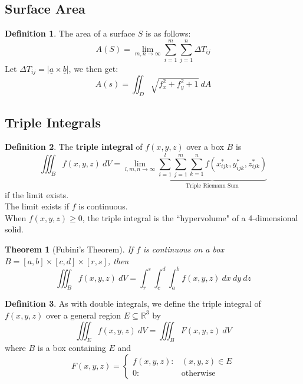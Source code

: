 \documentclass[12 pt]{article}
\newtheorem{thm}{Theorem}
\theoremstyle{definition}
\newtheorem{defn}{Definition}
\begin{document}
\subsection{Surface Area}
\begin{defn}
  The area of a surface $S$ is as follows:
  $$A(S)=\lim_{m,n\to \infty}\sum_{i=1}^{m}\sum_{j=1}^n \Delta T_{ij}$$
  Let $\Delta T_{ij}=|\underline{a}\times \underline{b}|$, we then get:
  $$A(s)=\iint_D \sqrt{f_x^2+f_y^2+1}\ dA$$
\end{defn}
\subsection{Triple Integrals}
\begin{defn}
  The \textbf{triple integral} of $f(x,y,z)$ over a box $B$ is
  $$\iiint_{B}f(x,y,z)\ dV = \lim_{l,m,n \to \infty} \underbrace{\sum_{i=1}^l \sum_{j=1}^m \sum_{k=1}^nf(x_{ijk}^*,y_{ijk}^*,z_{ijk}^*)}_{\text{Triple Riemann Sum}}$$ if the limit exists.
  \\ The limit exists if $f$ is continuous.
  \\ When $f(x,y,z)\geq 0$, the triple integral is the ``hypervolume" of a 4-dimensional solid.
\end{defn}
\begin{thm}[Fubini's Theorem]
  If $f$ is continuous on a box $B=[a,b]\times [c,d]\times [r,s]$, then
  $$\iiint_{B} f(x,y,z)\ dV = \int_{r}^{s}\int_{c}^{d}\int_{a}^{b}f(x,y,z)\ dx \ dy \ dz$$
\end{thm}
\begin{defn}
  As with double integrals, we define the triple integral of $f(x,y,z)$ over a general region $E \subseteq \mathbb{R}^3$ by
  $$ \iiint_{E}f(x,y,z)\ dV = \iiint_{B}F(x,y,z)\ dV$$
  where $B$ is a box containing $E$ and
  $$F(x,y,z)=
  \begin{cases}
    f(x,y,z): & (x,y,z)\in E
    \\0: & \text{otherwise}
  \end{cases}$$
\end{defn}
\end{document}
